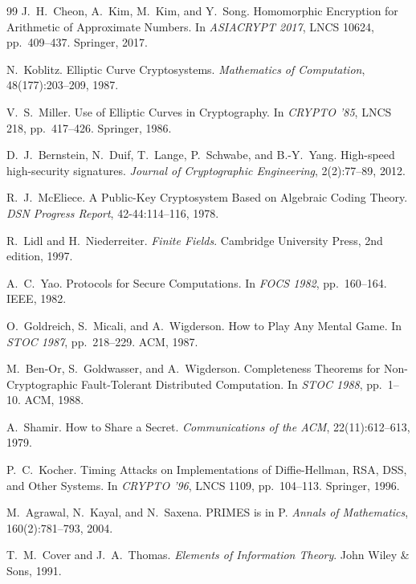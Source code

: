 ﻿\documentclass[a4paper,12pt]{scrreprt}
\theoremstyle{definition}
\begin{document}
\begin{thebibliography}{99}
J.\ H.\ Cheon, A.\ Kim, M.\ Kim, and Y.\ Song. Homomorphic Encryption for Arithmetic of Approximate Numbers. In \textit{ASIACRYPT 2017}, LNCS 10624, pp.\ 409--437. Springer, 2017.

N.\ Koblitz. Elliptic Curve Cryptosystems. \textit{Mathematics of Computation}, 48(177):203--209, 1987.

V.\ S.\ Miller. Use of Elliptic Curves in Cryptography. In \textit{CRYPTO '85}, LNCS 218, pp.\ 417--426. Springer, 1986.

D.\ J.\ Bernstein, N.\ Duif, T.\ Lange, P.\ Schwabe, and B.-Y.\ Yang. High-speed high-security signatures. \textit{Journal of Cryptographic Engineering}, 2(2):77--89, 2012.

R.\ J.\ McEliece. A Public-Key Cryptosystem Based on Algebraic Coding Theory. \textit{DSN Progress Report}, 42-44:114--116, 1978.

R.\ Lidl and H.\ Niederreiter. \textit{Finite Fields}. Cambridge University Press, 2nd edition, 1997.

A.\ C.\ Yao. Protocols for Secure Computations. In \textit{FOCS 1982}, pp.\ 160--164. IEEE, 1982.

O.\ Goldreich, S.\ Micali, and A.\ Wigderson. How to Play Any Mental Game. In \textit{STOC 1987}, pp.\ 218--229. ACM, 1987.

M.\ Ben-Or, S.\ Goldwasser, and A.\ Wigderson. Completeness Theorems for Non-Cryptographic Fault-Tolerant Distributed Computation. In \textit{STOC 1988}, pp.\ 1--10. ACM, 1988.

A.\ Shamir. How to Share a Secret. \textit{Communications of the ACM}, 22(11):612--613, 1979.

P.\ C.\ Kocher. Timing Attacks on Implementations of Diffie-Hellman, RSA, DSS, and Other Systems. In \textit{CRYPTO '96}, LNCS 1109, pp.\ 104--113. Springer, 1996.

M.\ Agrawal, N.\ Kayal, and N.\ Saxena. PRIMES is in P. \textit{Annals of Mathematics}, 160(2):781--793, 2004.

T.\ M.\ Cover and J.\ A.\ Thomas. \textit{Elements of Information Theory}. John Wiley \& Sons, 1991.


\end{thebibliography}
\end{document}
